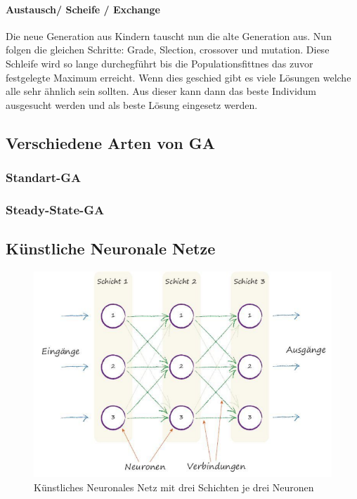 \paragraph{Austausch/ Scheife / Exchange}
Die neue Generation aus Kindern tauscht nun die alte Generation aus. Nun folgen die gleichen Schritte: Grade, Slection, crossover und mutation. 
Diese Schleife wird so lange durchegführt bis die Populationsfittnes das zuvor festgelegte Maximum erreicht. Wenn dies geschied gibt es viele Lösungen welche alle sehr ähnlich sein sollten. Aus dieser kann dann das beste Individum ausgesucht werden und als beste Lösung eingesetz werden. 


\subsection{Verschiedene Arten von GA}
\subsubsection{Standart-GA}
\subsubsection{Steady-State-GA}
\newpage

\subsection{Künstliche Neuronale Netze}

\begin{figure}[htb]
  \centering  
  \includegraphics[scale=0.5]{img/S36_Buildyourown.png}
  \caption{Künstliches Neuronales Netz mit drei Schichten je drei Neuronen \cite{Rashid2017} }
  \label{fig:neural_network}
\end{figure}


